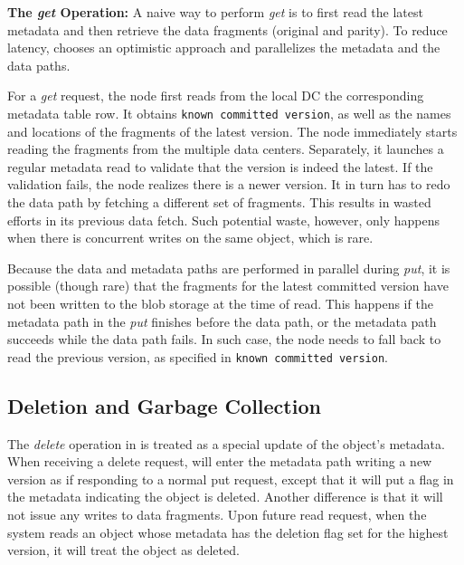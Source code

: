 {\bf The \emph{get} Operation:}
A naive way to perform {\em get} is to first read the latest metadata and then retrieve the data fragments (original and parity).
To reduce latency, {\name} chooses an optimistic approach and parallelizes the metadata and the data paths.

For a {\em get} request, the {\name} node first reads from the local DC the corresponding metadata table row.
It obtains {\tt known committed version}, as well as the names and locations of the fragments of the latest version.
The \name node immediately starts reading the fragments from the multiple data centers.
Separately, it launches a regular metadata read to validate that the version is indeed the latest.
If the validation fails, the \name node realizes there is a newer version.
It in turn has to redo the data path by fetching a different set of fragments.
This results in wasted efforts in its previous data fetch.
Such potential waste, however, only happens when there is concurrent writes on the same object,
which is rare.

Because the data and metadata paths are performed in parallel during {\em put},
it is possible (though rare) that the fragments for the latest committed version
have not been written to the blob storage at the time of read.
This happens if the metadata path in the {\em put} finishes before the data path,
or the metadata path succeeds while the data path fails.
In such case, the {\name} node needs to fall back to read the previous version,
as specified in {\tt known committed version}.


\subsection{Deletion and Garbage Collection}
\label{sec:garbagecollection}

The \emph{delete} operation in \name is treated as a special update of the
object's metadata. When receiving a delete request, \name will enter the
metadata path writing a new version as if responding to a normal put request,
except that it will put a flag in the metadata indicating the object is deleted.
Another difference is that it will not issue any writes to data fragments. Upon
future read request, when the system reads an object whose metadata has the
deletion flag set for the highest version, it will treat the object as deleted.

